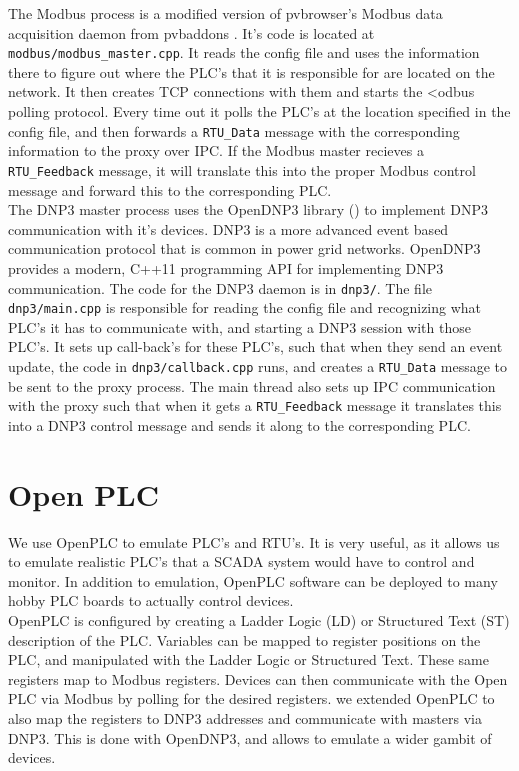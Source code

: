 \documentclass[11pt,a4paper,oldfontcommands]{memoir}
\def\code#1{\texttt{#1}}
\begin{document}
\indent
The Modbus process is a modified version of pvbrowser's Modbus data acquisition daemon
from pvbaddons \cite{pvbaddons}.
It's code is located at \code{modbus/modbus\_master.cpp}. It reads the config file and uses
the information there to figure out where the PLC's that it is responsible for are
located on the network. It then creates TCP connections with them and starts
the <odbus polling protocol. Every time out it polls the PLC's at the location
specified in the config file, and then forwards a \code{RTU\_Data} message with
the corresponding information to the proxy over IPC. If the Modbus master recieves
a \code{RTU\_Feedback} message, it will translate this into the proper Modbus
control message and forward this to the corresponding PLC. \\

\indent
The DNP3 master process uses the OpenDNP3 library (\cite{OpenDNP3}) to implement 
DNP3 communication with it's devices. DNP3 is a more advanced event based communication
protocol that is common in power grid networks. OpenDNP3 provides a modern, C++11 
programming API for implementing DNP3 communication. The code for the DNP3 daemon is in
\code{dnp3/}. The file \code{dnp3/main.cpp} is responsible for reading the config file
and recognizing what PLC's it has to communicate with, and starting a DNP3 session with 
those PLC's. It sets up call-back's for these PLC's, such that when they send an event
update, the code in \code{dnp3/callback.cpp} runs, and creates a \code{RTU\_Data}
message to be sent to the proxy process. The main thread also sets up IPC communication
with the proxy such that when it gets a \code{RTU\_Feedback} message it translates
this into a DNP3 control message and sends it along to the corresponding PLC. \\


\section{Open PLC}

\indent \indent 
We use OpenPLC \cite{OpenPLC} to emulate PLC's and RTU's. It is very useful, as
it allows us to emulate realistic PLC's that a SCADA system would have to
control and monitor. In addition to emulation, OpenPLC software can be deployed to 
many hobby PLC boards to actually control devices. \\

\indent 
OpenPLC is configured by creating a Ladder Logic (LD) or Structured Text (ST) 
description of the PLC. Variables
can be mapped to register positions on the PLC, and manipulated with the
Ladder Logic or Structured Text. These same registers map to Modbus registers. Devices
can then communicate with the Open PLC via Modbus by polling for the desired registers. 
we extended OpenPLC to also map the registers to DNP3 addresses and communicate with 
masters via DNP3. This is done with OpenDNP3, and allows to emulate a wider gambit
of devices.\\
\end{document}
